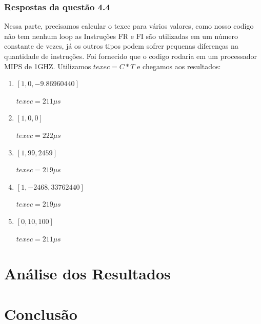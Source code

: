 \documentclass[12pt]{article}
\begin{document}
\subsubsection{Respostas da questão 4.4}
\label{subsubsec:4.4}
Nessa parte, precisamos calcular o texec para vários valores, como nosso codigo não tem nenhum loop as Instruções FR e FI são utilizadas em um número constante de vezes, já os outros tipos podem sofrer pequenas diferenças na quantidade de instruções. Foi fornecido que o codigo rodaria em um processador MIPS de 1GHZ. Utilizamos \(texec= C * T\) e chegamos aos resultados:

\begin{enumerate}[label={\alph*)}]
\item \([1, 0, -9.86960440]\)

	\(texec = 211 \mu s\)
\item \([1, 0, 0]\)

	\(texec = 222 \mu s\)
\item \([1, 99, 2459]\)

	\(texec = 219 \mu s\)

\item \([1, -2468, 33762440]\)

	\(texec = 219 \mu s\)
\item \([0, 10, 100]\)

	\(texec = 211 \mu s\)
\end{enumerate}

\section{Análise dos Resultados}
\label{sec:Resultados}

\section{Conclusão}
\label{sec:Conclusao}



\end{document}
